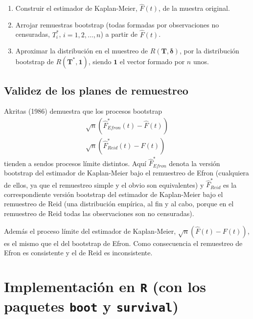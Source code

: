 \documentclass[
]{book}
\theoremstyle{definition}
\theoremstyle{definition}
\theoremstyle{definition}
\theoremstyle{remark}
\begin{document}
\begin{enumerate}
\def\labelenumi{\arabic{enumi}.}
\item
  Construir el estimador de Kaplan-Meier, \(\hat{F}\left( t \right)\),
  de la muestra original.
\item
  Arrojar remuestras bootstrap (todas formadas por observaciones no
  censuradas, \(T_i^{\ast}\), \(i=1,2,\ldots ,n\)) a partir de
  \(\hat{F}\left(t \right)\).
\item
  Aproximar la distribución en el muestreo de \(R\left( \mathbf{T},\boldsymbol{\delta} \right)\), por la
  distribución bootstrap de
  \(R\left( \mathbf{T}^{\ast},\mathbf{1} \right)\),
  siendo \(\mathbf{1}\) el vector formado
  por \(n\) unos.
\end{enumerate}

\hypertarget{validez-de-los-planes-de-remuestreo}{%
\subsection{Validez de los planes de remuestreo}\label{validez-de-los-planes-de-remuestreo}}

Akritas (1986) demuestra que los procesos bootstrap
\[\begin{aligned}
\sqrt{n}\left( \hat{F}^{\ast}_{Efron}\left( t \right) 
- \hat{F}\left( t \right) \right) \\ 
\sqrt{n}\left( \hat{F}^{\ast}_{Reid} \left( t \right) 
- \hat{F}\left( t \right) \right)
\end{aligned}\]
tienden a sendos procesos límite distintos. Aquí
\(\hat{F}^{\ast}_{Efron}\) denota la versión bootstrap del estimador
de Kaplan-Meier bajo el remuestreo de Efron (cualquiera de ellos, ya que
el remuestreo simple y el obvio son equivalentes) y
\(\hat{F}^{\ast}_{Reid}\) es la correspondiente versión bootstrap del
estimador de Kaplan-Meier bajo el remuestreo de Reid (una distribución
empírica, al fin y al cabo, porque en el remuestreo de Reid todas las
observaciones son no censuradas).

Además el proceso límite del estimador de Kaplan-Meier, \(\sqrt{n} \left( \hat{F}\left( t \right) -F\left( t \right) \right)\), es el mismo
que el del bootstrap de Efron. Como consecuencia el remuestreo de Efron
es consistente y el de Reid es inconsistente.

\hypertarget{implementaciuxf3n-en-r-con-los-paquetes-boot-y-survival}{%
\section{\texorpdfstring{Implementación en \texttt{R} (con los paquetes \texttt{boot} y \texttt{survival})}{Implementación en R (con los paquetes boot y survival)}}\label{implementaciuxf3n-en-r-con-los-paquetes-boot-y-survival}}
\end{document}

